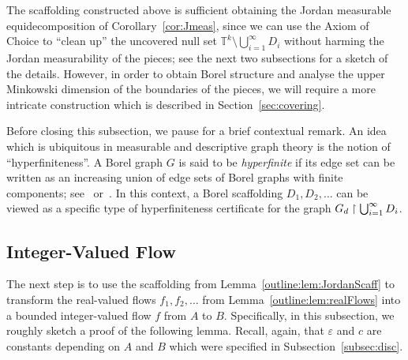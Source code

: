 \documentclass[12pt,a4paper]{amsart}
\numberwithin{equation}{section}
\theoremstyle{definition}
\begin{document}
The scaffolding constructed above is sufficient obtaining the Jordan measurable equidecomposition of Corollary~\ref{cor:Jmeas}, since we can use the Axiom of Choice to ``clean up'' the uncovered null set $\mathbb{T}^k\setminus \bigcup_{i=1}^\infty D_i$ without harming the Jordan measurability of the pieces; see the next two subsections for a sketch of the details. However, in order to obtain Borel structure and analyse the upper Minkowski dimension of the boundaries of the pieces, we will require a more intricate construction which is described in Section~\ref{sec:covering}.

Before closing this subsection, we pause for a brief contextual remark. An idea which is ubiquitous in measurable and descriptive graph theory is the notion of ``hyperfiniteness''. A Borel graph $G$ is said to be \emph{hyperfinite} if its edge set can be written as an increasing union of edge sets of Borel graphs with finite components; see~\cite[p.~19]{KechrisMiller04} or~\cite[Section~5,\textbf{(C)}]{KechrisMarks16}. In this context, a Borel scaffolding $D_1,D_2,\dots$ can be viewed as a specific type of hyperfiniteness certificate for the graph $G_d\upharpoonright \bigcup_{i=1}^\infty D_i$. 

\subsection{Integer-Valued Flow}
\label{subsec:intFlows}

The next step is to use the scaffolding from Lemma~\ref{outline:lem:JordanScaff} to transform the real-valued flows $f_1,f_2,\dots$ from Lemma~\ref{outline:lem:realFlows} into a bounded integer-valued flow $f$ from $A$ to $B$. Specifically, in this subsection, we roughly sketch a proof of the following lemma. Recall, again, that $\varepsilon$ and $c$ are constants depending on $A$ and $B$ which were specified in Subsection~\ref{subsec:disc}.
\end{document}
